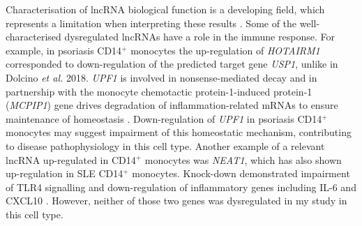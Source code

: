 Characterisation of lncRNA biological function is a developing field, which represents a limitation when interpreting these results \parencite{Uszczynska-Ratajczak2018}.  Some of the well-characterised dysregulated lncRNAs have a role in the immune response. For example, in psoriasis CD14$^+$ monocytes the up-regulation of \textit{HOTAIRM1} corresponded to down-regulation of the predicted target gene \textit{USP1}, unlike in Dolcino \textit{et al.} 2018. \textit{UPF1} is involved in nonsense-mediated decay and in partnership with the monocyte chemotactic protein-1-induced protein-1 (\textit{MCPIP1}) gene drives degradation of inflammation-related mRNAs to ensure maintenance of homeostasis \parencite{Mino2015}. Down-regulation of \textit{UPF1} in psoriasis CD14$^+$ monocytes may suggest impairment of this homeostatic mechanism, contributing to disease pathophysiology in this cell type. Another example of a relevant lncRNA up-regulated in CD14$^+$ monocytes was \textit{NEAT1}, which has also shown up-regulation in SLE CD14$^+$ monocytes. Knock-down demonstrated impairment of TLR4 signalling and down-regulation of inflammatory genes including IL-6 and CXCL10 \parencite{Zhang2016}. However, neither of those two genes was dysregulated in my study in this cell type. 


